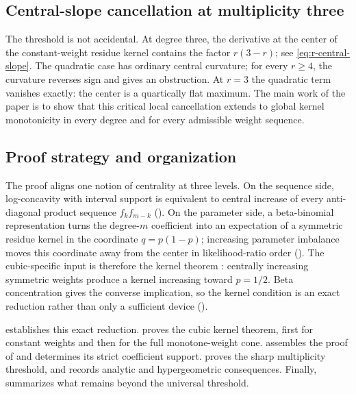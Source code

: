 \documentclass[11pt,a4paper]{amsart}
\numberwithin{equation}{section}
\theoremstyle{plain}
\theoremstyle{definition}
\begin{document}
\subsection{Central-slope cancellation at multiplicity three}\label{subsec:intro-central-slope}

The threshold is not accidental.  At degree three, the derivative at the center of
the constant-weight residue kernel contains the factor \(r(3-r)\); see
\eqref{eq:r-central-slope}.  The quadratic case has ordinary central curvature;
for every \(r\ge4\), the curvature reverses sign and gives an obstruction.  At
\(r=3\) the quadratic term vanishes exactly: the center is a quartically flat
maximum.  The main work of the paper is to show that this critical local cancellation
extends to global kernel monotonicity in every degree and for every admissible weight
sequence.

\subsection{Proof strategy and organization}\label{subsec:intro-organization}

The proof aligns one notion of centrality at three levels.  On the sequence side,
log-concavity with interval support is equivalent to central increase of every
anti-diagonal product sequence \(f_kf_{m-k}\) ().  On the
parameter side, a beta-binomial representation turns the degree-\(m\) coefficient
into an expectation of a symmetric residue kernel in the coordinate
\(q=p(1-p)\); increasing parameter imbalance moves this coordinate away from the
center in likelihood-ratio order ().  The cubic-specific input
is therefore the kernel theorem : centrally increasing symmetric
weights produce a kernel increasing toward \(p=1/2\).  Beta concentration gives the
converse implication, so the kernel condition is an exact reduction rather than only
a sufficient device ().

 establishes this exact reduction.   proves the
cubic kernel theorem, first for constant weights and then for the full monotone-weight
cone.   assembles the proof of  and determines
its strict coefficient support.   proves the sharp multiplicity
threshold, and  records analytic and hypergeometric
consequences.  Finally,  summarizes what remains beyond the
universal threshold.
\end{document}
